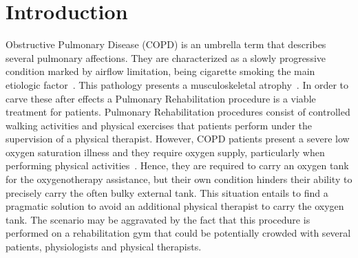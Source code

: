 \documentclass[journal]{IEEEtran}
\begin{document}
%
\IEEEpeerreviewmaketitle



\section{Introduction}
% 
% 
% 
% 


 Obstructive Pulmonary Disease (COPD) is an umbrella term that describes several pulmonary affections.  They are characterized as a slowly progressive condition marked by airflow limitation, being cigarette smoking the main etiologic factor~\cite{MacNee2005}. This pathology presents a musculoskeletal atrophy~\cite{Kocsis2016,Wu2012}. In order to carve these after effects a Pulmonary Rehabilitation procedure is a viable treatment for patients.  Pulmonary Rehabilitation procedures consist of controlled walking activities and physical exercises that patients perform under the supervision of a physical therapist.  However, COPD patients present a severe low oxygen saturation illness and they require oxygen supply, particularly when performing physical activities~\cite{Celli2014}.  Hence, they are required to carry an oxygen tank for the oxygenotherapy assistance, but their own condition hinders their ability to precisely carry the often bulky external tank.  This situation entails to find a pragmatic solution to avoid an additional physical therapist to carry the oxygen tank.  The scenario may be aggravated by the fact that this procedure is performed on a rehabilitation gym that could be potentially crowded with several patients, physiologists and physical therapists.  
\end{document}
